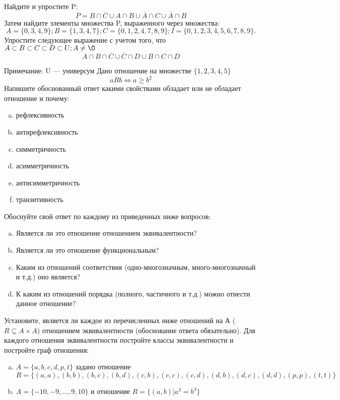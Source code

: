 \documentclass[10pt]{exam}
\begin{document}
\begin{questions}
\question
Найдите и упростите P:
\begin{equation*}
\overline{P} = B \cap \overline{C} \cup A \cap B \cup \overline{A} \cap C \cup \overline{A} \cap B
\end{equation*}
Затем найдите элементы множества P, выраженного через множества:
\begin{equation*}
A = \{0, 3, 4, 9\}; 
B = \{1, 3, 4, 7\};
C = \{0, 1, 2, 4, 7, 8, 9\};
I = \{0, 1, 2, 3, 4, 5, 6, 7, 8, 9\}.
\end{equation*}\question
Упростите следующее выражение с учетом того, что $A\subset B \subset C \subset D \subset U; A \neq \O$
\begin{equation*}
A \cap B  \cap \overline{C} \cup \overline{C} \cap D \cup B \cap C \cap D
\end{equation*}

Примечание: U — универсум\question
Дано отношение на множестве $\{1, 2, 3, 4, 5\}$ 
\begin{equation*}
aRb \iff a \geq b^2
\end{equation*}
Напишите обоснованный ответ какими свойствами обладает или не обладает отношение и почему:   
\begin{enumerate} [a)]\setcounter{enumi}{0}
\item рефлексивность
\item антирефлексивность
\item симметричность
\item асимметричность
\item антисимметричность
\item транзитивность
\end{enumerate}

Обоснуйте свой ответ по каждому из приведенных ниже вопросов:
\begin{enumerate} [a)]\setcounter{enumi}{0}
    \item Является ли это отношение отношением эквивалентности?
    \item Является ли это отношение функциональным?
    \item Каким из отношений соответствия (одно-многозначным, много-многозначный и т.д.) оно является?
    \item К каким из отношений порядка (полного, частичного и т.д.) можно отнести данное отношение?
\end{enumerate}


\question
Установите, является ли каждое из перечисленных ниже отношений на А ($R \subseteq A \times A$) отношением эквивалентности (обоснование ответа обязательно). Для каждого отношения эквивалентности постройте классы 
эквивалентности и постройте граф отношения:
\begin{enumerate} [a)]\setcounter{enumi}{0}
\item $A = \{a, b, c, d, p, t\}$ задано отношение $R = \{(a, a), (b, b), (b, c), (b, d), (c, b), (c, c), (c, d), (d, b), (d, c), (d, d), (p,p), (t,t)\}$
\item $A = \{-10, -9, … , 9, 10\}$ и отношение $R = \{(a,b)|a^{3} = b^{3}\}$


\end{enumerate}
\end{questions}
\end{document}
